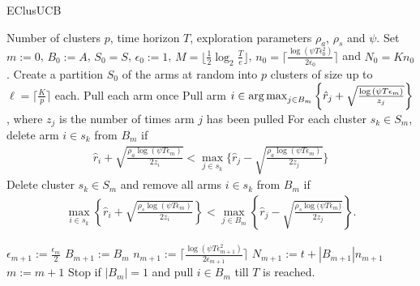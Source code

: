 \begin{algorithm}[!h]
\caption{EClusUCB}
\label{alg:eclusucb}
\begin{algorithmic}
 Number of clusters $p$, time horizon $T$, exploration parameters $\rho_a$, $\rho_s$ and $\psi$.
 Set $m:=0$, $B_{0}:=A$, $S_0 = S$, $\epsilon_{0}:=1$, $M=\big \lfloor \frac{1}{2}\log_{2} \frac{T}{e}\big\rfloor$, $n_{0}=\bigg\lceil\frac{\log{(\psi T\epsilon_{0}^{2})}}{2\epsilon_{0}}\bigg\rceil$ and  $N_{0}=Kn_{0}$.
\State Create a partition $S_0$ of the arms at random into $p$ clusters of size up to $\ell=\bigg\lceil \frac{K}{p} \bigg\rceil$ each.
\State Pull each arm once
\State Pull arm $i\in \operatorname*{arg\,max}_{j\in B_{m}}\bigg\lbrace \hat{r}_{j} + \sqrt{\frac{\log{(\psi T\epsilon_{m})}}{ z_{j}}} \bigg\rbrace$, where $z_j$ is the number of times arm $j$ has been pulled
\ArmElim
\State For each cluster $s_k \in S_{m}$, delete arm ${i}\in s_{k}$ from $B_{m}$ if
\begin{align*}
\hat{r}_{i} + \sqrt{\frac{\rho_{a}\log{(\psi T\epsilon_{m})}}{2 z_{i}}}  < \max_{{j}\in s_{k}}\bigg\lbrace\hat{r}_{j} -\sqrt{\frac{\rho_{a}\log{(\psi T\epsilon_{m})}}{2 z_{j}}} \bigg\rbrace
\end{align*}
\EndArmElim
\ClusElim
\State Delete cluster $s_{k}\in S_{m}$ and remove all arms $i\in s_{k}$ from $B_{m}$ if 
\begin{align*}
 \max_{{i}\in s_{k}}\left\lbrace\hat{r}_{i} + \sqrt{\frac{\rho_{s}\log{(\psi T\epsilon_{m})}}{2 z_{i}}}\right\rbrace 
 < \max_{{j}\in B_{m}} \left\lbrace\hat{r}_{j} - \sqrt{\frac{\rho_{s} \log{(\psi T\epsilon_{m}})}{2 z_{j}}}\right\rbrace.
\end{align*}
\EndClusElim

\ResParam
\State $\epsilon_{m+1}:=\frac{\epsilon_{m}}{2}$\vspace{0.5ex}
\State $B_{m+1}:=B_{m}$
\State $n_{m+1}:=\bigg\lceil\frac{\log{(\psi T\epsilon_{m+1}^{2})}}{2\epsilon_{m+1}}\bigg\rceil$
\State $N_{m+1}:=t+|B_{m+1}| n_{m+1}$
\State $m:=m+1$
\EndResParam
\State Stop if $|B_{m}|=1$ and pull ${i}\in B_{m}$ till $T$ is reached.
\EndIf
\EndFor
\end{algorithmic}
\end{algorithm}
